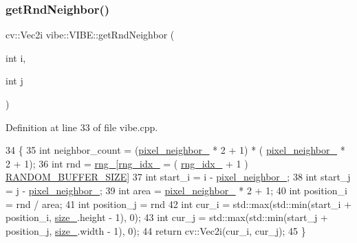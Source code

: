 \subsubsection{\texorpdfstring{get\+Rnd\+Neighbor()}{getRndNeighbor()}}
{\footnotesize\ttfamily cv\+::\+Vec2i vibe\+::\+V\+I\+B\+E\+::get\+Rnd\+Neighbor (\begin{DoxyParamCaption}\item[{int}]{i,  }\item[{int}]{j }\end{DoxyParamCaption})\hspace{0.3cm}{\ttfamily [private]}}



Definition at line 33 of file vibe.\+cpp.


\begin{DoxyCode}
34 \{
35     \textcolor{keywordtype}{int} neighbor\_count = (\mbox{\hyperlink{classvibe_1_1_v_i_b_e_ace9a8955d2ca2acdcb8efe79a448ce7c}{pixel\_neighbor\_}} * 2 + 1) * (
      \mbox{\hyperlink{classvibe_1_1_v_i_b_e_ace9a8955d2ca2acdcb8efe79a448ce7c}{pixel\_neighbor\_}} * 2 + 1);
36     \textcolor{keywordtype}{int} rnd = \mbox{\hyperlink{classvibe_1_1_v_i_b_e_abc43782cfa12e3f055fa1212833f8595}{rng\_}}[\mbox{\hyperlink{classvibe_1_1_v_i_b_e_a76075aca9f68dffb84163e510b2dd122}{rng\_idx\_}} = ( \mbox{\hyperlink{classvibe_1_1_v_i_b_e_a76075aca9f68dffb84163e510b2dd122}{rng\_idx\_}} + 1 ) %
      \mbox{\hyperlink{vibe_8hpp_a776fe25c29d34b95d69a1418f75ae80f}{RANDOM\_BUFFER\_SIZE}}] %
37     \textcolor{keywordtype}{int} start\_i = i - \mbox{\hyperlink{classvibe_1_1_v_i_b_e_ace9a8955d2ca2acdcb8efe79a448ce7c}{pixel\_neighbor\_}};
38     \textcolor{keywordtype}{int} start\_j = j - \mbox{\hyperlink{classvibe_1_1_v_i_b_e_ace9a8955d2ca2acdcb8efe79a448ce7c}{pixel\_neighbor\_}};
39     \textcolor{keywordtype}{int} area = \mbox{\hyperlink{classvibe_1_1_v_i_b_e_ace9a8955d2ca2acdcb8efe79a448ce7c}{pixel\_neighbor\_}} * 2 + 1;
40     \textcolor{keywordtype}{int} position\_i = rnd / area;
41     \textcolor{keywordtype}{int} position\_j = rnd %
42     \textcolor{keywordtype}{int} cur\_i = std::max(std::min(start\_i + position\_i, \mbox{\hyperlink{classvibe_1_1_v_i_b_e_a4748d53eff7e5a96ad4f98206dc7bb2c}{size\_}}.height - 1), 0);
43     \textcolor{keywordtype}{int} cur\_j = std::max(std::min(start\_j + position\_j, \mbox{\hyperlink{classvibe_1_1_v_i_b_e_a4748d53eff7e5a96ad4f98206dc7bb2c}{size\_}}.width - 1), 0);
44     \textcolor{keywordflow}{return} cv::Vec2i(cur\_i, cur\_j);
45 \}
\end{DoxyCode}
